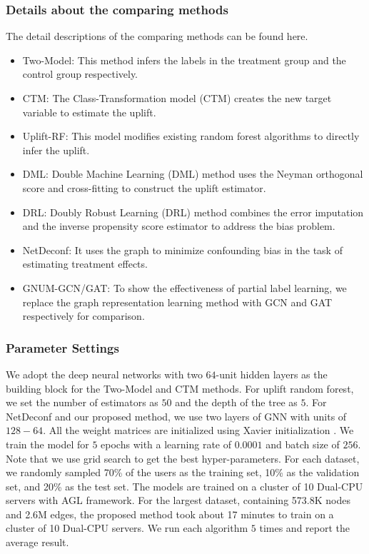 \subsubsection{Details about the comparing methods}
\label{appn:baseline}
The detail descriptions of the comparing methods can be found here. 
\begin{itemize}
	\item{Two-Model: This method infers the labels in the treatment group and the control group respectively. }
	\item{CTM: The Class-Transformation model (CTM) creates the new target variable to estimate the uplift.}
	\item{Uplift-RF}: This model modifies existing random forest algorithms to directly infer the uplift.
	\item{DML}: Double Machine Learning (DML) method uses the Neyman orthogonal score and cross-fitting to construct the uplift estimator.
	\item{DRL}: Doubly Robust Learning (DRL) method combines the error imputation and the inverse propensity score estimator to address the bias problem.
	\item{NetDeconf}: It uses the graph to minimize confounding bias in the task of estimating treatment effects.
	\item{GNUM-GCN/GAT}: To show the effectiveness of partial label learning, we replace the graph representation learning method with GCN and GAT respectively for comparison.
\end{itemize}


\subsubsection{Parameter Settings}
\label{appn:para}
We adopt the deep neural networks \cite{liu2017survey} with two $64$-unit hidden layers as the building block for the Two-Model and CTM methods. For uplift random forest, we set the number of estimators as $50$ and the depth of the tree as $5$. For NetDeconf and our proposed method, we use two layers of GNN with units of $128-64$. All the weight matrices are initialized using Xavier initialization \cite{glorot2010understanding}.  We train the model for $5$ epochs with a learning rate of $0.0001$ and batch size of $256$. Note that we use grid search to get the best hyper-parameters. For each dataset, we randomly sampled 70\% of the users as the training set, 10\% as the validation set, and 20\% as the test set.  The models are trained on a cluster of 10 Dual-CPU servers with AGL \cite{zhang2020agl} framework. For the largest dataset, containing 573.8K nodes and 2.6M edges, the proposed method took about 17 minutes to train on a cluster of 10 Dual-CPU servers. We run each algorithm $5$ times and report the average result. 

